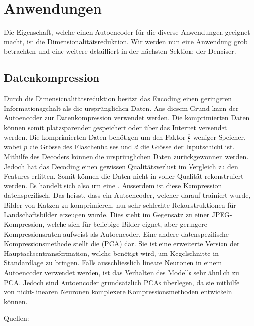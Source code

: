 \section{Anwendungen}
Die Eigenschaft, welche einen Autoencoder für die diverse
Anwendungen geeignet macht, ist die Dimensionalitätsreduktion.
Wir werden nun eine Anwendung grob betrachten und eine weitere detailliert
in der nächsten Sektion: der Denoiser.

\subsection{Datenkompression}
Durch die Dimensionalitätsreduktion besitzt das Encoding einen geringeren
Informationsgehalt als die ursprünglichen Daten. Aus diesem Grund kann der
Autoencoder zur Datenkompression verwendet werden. Die komprimierten Daten
können somit platzsparender gespeichert oder über das Internet versendet werden.
Die komprimierten Daten benötigen um den Faktor $\frac{p}{d}$ weniger Speicher,
wobei $p$ die Grösse des Flaschenhalses und $d$ die Grösse
der Inputschicht ist.
Mithilfe des Decoders können die ursprünglichen Daten zurückgewonnen werden.
Jedoch hat das Decoding einen gewissen Qualitätsverlust im Vergleich zu den
Features erlitten. Somit können die Daten nicht in voller Qualität rekonstruiert
werden. Es handelt sich also um eine .
Ausserdem ist diese Kompression datenspezifisch. Das heisst, dass ein
Autoencoder, welcher darauf trainiert wurde, Bilder von Katzen zu komprimieren,
nur sehr schlechte Rekonstruktionen für Landschaftsbilder erzeugen würde. Dies
steht im Gegensatz zu einer JPEG-Kompression, welche sich für beliebige
Bilder eignet, aber geringere Kompressionsraten aufweist als Autoencoder.
\para{}
Eine andere datenspezifische Kompressionsmethode stellt die
 (PCA) dar. Sie ist eine erweiterte Version der
Hauptachsentransformation, welche benötigt wird, um Kegelschnitte in
Standardlage zu bringen. Falls ausschliesslich lineare Neuronen in einem
Autoencoder verwendet werden, ist das Verhalten des Modells sehr ähnlich zu PCA.
Jedoch sind Autoencoder grundsätzlich PCAs überlegen, da sie mithilfe von
nicht-linearen Neuronen komplexere Kompressionsmethoden entwickeln können.

\para{}
Quellen: \cite{paper:autoencoder_compression} \cite{paper:pca}


